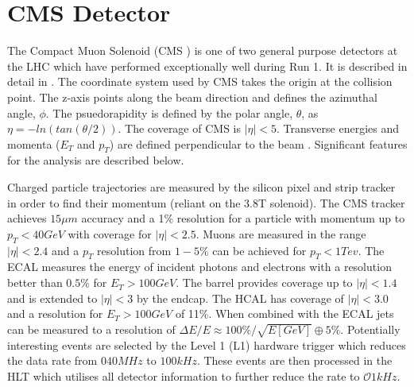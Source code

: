\section{CMS Detector}

The Compact Muon Solenoid (CMS \cite{CMSTDR}) is one of two general purpose detectors at the LHC which have performed exceptionally well during Run 1. 
It is described in detail in \cite{CMS}. 
The coordinate system used by CMS takes the origin at the collision point. 
The z-axis points along the beam direction and defines the azimuthal angle, $\phi$. 
The psuedorapidity is defined by the polar angle, $\theta$, as $\eta=-ln(tan(\theta/2))$. 
The coverage of CMS is $|\eta|<5$. 
Transverse energies and momenta ($E_T $ and $p_T$) are defined perpendicular to the beam \cite{cmsiop}. Significant features for the \alphat analysis are described below.

Charged particle trajectories are measured by the silicon pixel and strip tracker \cite{siliconTDR} 
in order to find their momentum (reliant on the 3.8T solenoid).
The CMS tracker achieves $15\mu m$ accuracy and a 1\% resolution for a particle with momentum 
up to $p_T < 40GeV$ with coverage for $|\eta|<2.5$. 
Muons are measured in the range $|\eta|<2.4$ and a $p_T$ resolution from $1-5\%$ can be achieved 
for $p_T < 1Tev$. The ECAL measures the energy of incident photons and electrons with a resolution better  than $0.5\%$ for $E_T > 100 GeV$. The barrel provides
 coverage up to $|\eta| < 1.4$ and is extended to 
  $|\eta|<3$ by the endcap. The HCAL has coverage of $|\eta|<3.0$ \cite{hcal} and a resolution for $E_T > 100GeV$ of 11\%. 
  When combined with the ECAL jets can be measured to a
  resolution of $\Delta E/E \approx 100 \%/\sqrt{E[GeV]} \oplus 5\%$.
Potentially interesting events are selected by the Level 1 (L1) 
hardware trigger which reduces the data rate from $\mathcal{0}40MHz$ to $100kHz$. 
These events are then processed in the HLT which utilises 
all detector information to further reduce the rate 
to $\mathcal{O}1kHz$.







